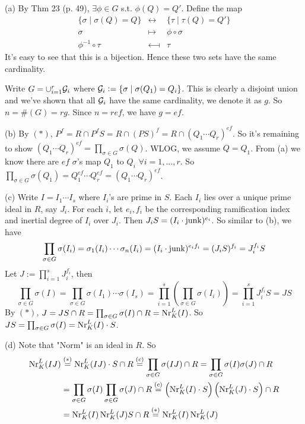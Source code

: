 \documentclass[../Marcus.tex]{subfiles}
\begin{document}
(a) By Thm 23 (p. 49), $\exists\phi\in G$ s.t. $\phi(Q)=Q'$. Define the map
$$
\begin{array}{ccc}
\{\sigma\mid \sigma(Q)=Q\} & \longleftrightarrow & \{\tau\mid \tau(Q)=Q'\} \\
\sigma & \longmapsto & \phi\circ\sigma \\
\phi^{-1}\circ\tau & \longmapsfrom & \tau
\end{array}
$$
It's easy to see that this is a bijection. Hence these two sets have the same cardinality.

Write $G=\cup_{i=1}^r \mathcal{G}_i$ where $\mathcal{G}_i:=\{\sigma\mid \sigma(Q_1)=Q_i\}$. This is clearly a disjoint union and we've shown that all $\mathcal{G}_i$ have the same cardinality, we denote it as $g$. So $n=\#(G)=rg$. Since $n=ref$, we have $g=ef$.

(b) By $(*)$, $P^f=R\cap P^fS=R\cap(PS)^f=R\cap(Q_1\cdots Q_r)^{ef}$. So it's remaining to show $(Q_1\cdots Q_r)^{ef}=\prod_{\sigma\in G}\sigma(Q)$. WLOG, we assume $Q=Q_1$. From (a) we know there are $ef$ $\sigma$'s map $Q_1$ to $Q_i$ $\forall i=1,\ldots,r$. So $\prod_{\sigma\in G}\sigma(Q_1)=Q_1^{ef}\cdots Q_r^{ef}=(Q_1\cdots Q_r)^{ef}$.

(c) Write $I=I_1\cdots I_s$ where $I_i$'s are prime in $S$. Each $I_i$ lies over a unique prime ideal in $R$, say $J_i$. For each $i$, let $e_i,f_i$ be the corresponding ramification index and inertial degree of $I_i$ over $J_i$. Then $J_iS=(I_i\cdot\operatorname{junk})^{e_i}$. So similar to (b), we have $$\prod_{\sigma\in G}\sigma(I_i)=\sigma_1(I_i)\cdots\sigma_n(I_i)=(I_i\cdot\operatorname{junk})^{e_if_i}=(J_iS)^{f_i}=J_i^{f_i}S$$ Let $J:=\prod_{i=1}^s J_i^{f_i}$, then $$\prod_{\sigma\in G}\sigma(I)=\prod_{\sigma\in G}\sigma(I_1)\cdots\sigma(I_s)=\prod_{i=1}^s\left(\prod_{\sigma\in G}\sigma(I_i)\right)=\prod_{i=1}^s J_i^{f_i}S=JS$$ By $(*)$, $J=JS\cap R=\prod_{\sigma\in G}\sigma(I)\cap R=\operatorname{Nr}^L_K(I)$. So $JS=\prod_{\sigma\in G}\sigma(I)=\operatorname{Nr}^L_K(I)\cdot S$.

(d) Note that "Norm" is an ideal in $R$. So
\begin{align*}
\operatorname{Nr}^L_K(IJ) &\overset{(*)}{=} \operatorname{Nr}^L_K(IJ)\cdot S\cap R \overset{(c)}{=} \prod_{\sigma\in G}\sigma(IJ)\cap R = \prod_{\sigma\in G}\sigma(I)\sigma(J)\cap R \\
&= \prod_{\sigma\in G}\sigma(I)\prod_{\sigma\in G}\sigma(J)\cap R \overset{(c)}{=} \left(\operatorname{Nr}^L_K(I)\cdot S\right)\left(\operatorname{Nr}^L_K(J)\cdot S\right)\cap R \\
&= \operatorname{Nr}^L_K(I)\operatorname{Nr}^L_K(J)S\cap R \overset{(*)}{=} \operatorname{Nr}^L_K(I)\operatorname{Nr}^L_K(J)
\end{align*}
\end{document}
